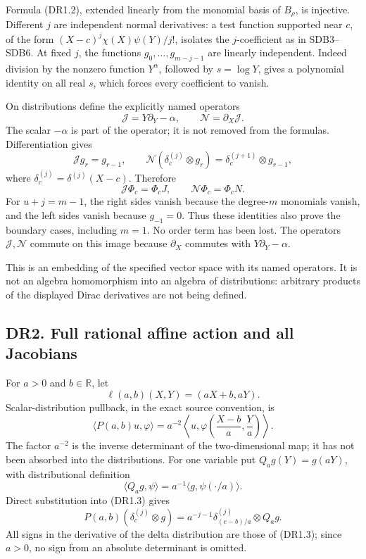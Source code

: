 Formula (DR1.2), extended linearly from the monomial basis of
\(B_\rho\), is injective. Different \(j\) are independent normal
derivatives: a test function supported near \(c\), of the form
\((X-c)^j\chi(X)\psi(Y)/j!\), isolates the \(j\)-coefficient as in
SDB3--SDB6. At fixed \(j\), the functions \(g_0,\ldots,g_{m-j-1}\) are
linearly independent. Indeed division by the nonzero function
\(Y^\alpha\), followed by \(s=\log Y\), gives a polynomial identity on
all real \(s\), which forces every coefficient to vanish.

On distributions define the explicitly named operators \[
 \mathscr J=Y\partial_Y-\alpha,\qquad
 \mathscr N=\partial_X\mathscr J.
\tag{DR1.4}
\] The scalar \(-\alpha\) is part of the operator; it is not removed
from the formulas. Differentiation gives \[
 \mathscr Jg_r=g_{r-1},\qquad
 \mathscr N(\delta^{(j)}_c\otimes g_r)
          =\delta^{(j+1)}_c\otimes g_{r-1},
\tag{DR1.5}
\] where \(\delta_c^{(j)}=\delta^{(j)}(X-c)\). Therefore \[
 \mathscr J\Phi_c=\Phi_c J,\qquad
 \mathscr N\Phi_c=\Phi_c N.
\tag{DR1.6}
\] For \(u+j=m-1\), the right sides vanish because the degree-\(m\)
monomials vanish, and the left sides vanish because \(g_{-1}=0\). Thus
these identities also prove the boundary cases, including \(m=1\). No
order term has been lost. The operators \(\mathscr J,\mathscr N\)
commute on this image because \(\partial_X\) commutes with
\(Y\partial_Y-\alpha\).

This is an embedding of the specified vector space with its named
operators. It is not an algebra homomorphism into an algebra of
distributions: arbitrary products of the displayed Dirac derivatives are
not being defined.

\subsection{DR2. Full rational affine action and all
Jacobians}\label{dr2.-full-rational-affine-action-and-all-jacobians}

For \(a>0\) and \(b\in\mathbb R\), let \[
 \ell(a,b)(X,Y)=(aX+b,aY).
\] Scalar-distribution pullback, in the exact source convention, is \[
 \langle P(a,b)u,\varphi\rangle
   =a^{-2}
      \left\langle u,
        \varphi\!\left(\frac{X-b}{a},\frac Ya\right)
      \right\rangle.
\tag{DR2.1}
\] The factor \(a^{-2}\) is the inverse determinant of the
two-dimensional map; it has not been absorbed into the distributions.
For one variable put \(Q_ag(Y)=g(aY)\), with distributional definition
\[
 \langle Q_ag,\psi\rangle
   =a^{-1}\langle g,\psi(\cdot/a)\rangle.
\tag{DR2.2}
\] Direct substitution into (DR1.3) gives \[
 P(a,b)(\delta_c^{(j)}\otimes g)
   =a^{-j-1}\delta_{(c-b)/a}^{(j)}\otimes Q_ag.
\tag{DR2.3}
\] All signs in the derivative of the delta distribution are those of
(DR1.3); since \(a>0\), no sign from an absolute determinant is omitted.

